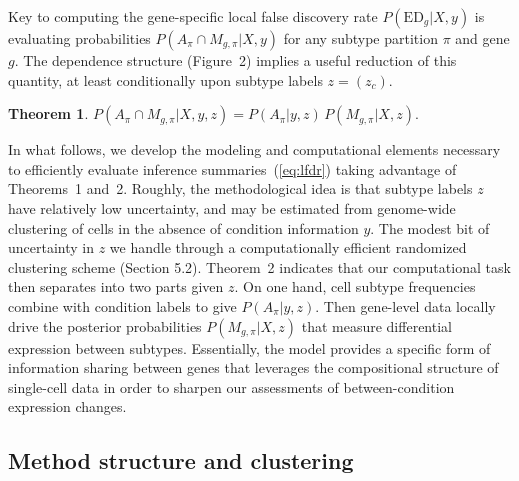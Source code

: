 \documentclass[11pt]{amsart}
\newtheorem{theorem}{Theorem}
\begin{document}
Key to computing the gene-specific 
local false discovery rate $P(\text{ED}_g|X,y)$ is
evaluating probabilities $P\left(A_\pi \cap M_{g,\pi} |X,y \right)$ for
any subtype partition $\pi$ and gene $g$.
The dependence structure (Figure~2) implies a useful reduction of this
quantity, at least conditionally upon subtype labels $z=(z_c)$.

\begin{theorem}  
$  P\left(A_\pi \cap M_{g,\pi} |X,y,z \right) 
  =  P\left(A_\pi |y,z \right) \, 
                      P\left(M_{g,\pi}| X,z \right).  $
\end{theorem}

In what follows, we develop the  modeling and computational elements necessary  to efficiently evaluate inference summaries~(\ref{eq:lfdr}) taking advantage of 
Theorems~1 and~2.  Roughly, the methodological idea is that subtype labels $z$
have relatively low uncertainty, and may be estimated from genome-wide 
clustering of cells in the absence of condition information $y$. The modest bit of uncertainty in $z$
we handle through a computationally efficient randomized clustering scheme
(Section 5.2). Theorem~2 indicates that our computational task then separates into
two parts given $z$.  On one hand, cell subtype frequencies 
combine with condition labels to give
$P\left(A_\pi |y,z \right)$. Then gene-level data
locally drive the posterior probabilities $P\left(M_{g,\pi}| X,z \right)$ that
measure differential expression between subtypes. 
Essentially, the model provides a specific form of information 
sharing between genes  that leverages the compositional structure of single-cell 
data in order to sharpen our assessments of between-condition expression changes. 


\subsection{Method structure and clustering}
\end{document}
